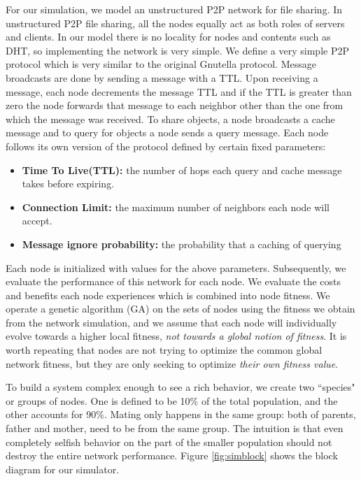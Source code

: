 \documentclass[12pt,journal,draftcls,letterpaper,onecolumn]{IEEEtran}
\begin{document}
For our simulation, we model an unstructured P2P network for file
sharing\cite{ek:survey}. In unstructured P2P file sharing, all the nodes
equally act as both roles of servers and clients.  In our model there is no
locality for nodes and contents such as DHT, so implementing the network is
very simple.  We define a very simple P2P protocol which is very similar to
the original Gnutella protocol.  Message broadcasts are done by sending a
message with a TTL.  Upon receiving a message, each node decrements the
message TTL and if the TTL is greater than zero the node forwards that message
to each neighbor other than the one from which the message was received.  To
share objects, a node broadcasts a cache message and to query for objects a
node sends a query message.  Each node follows its own version of the protocol
defined by certain fixed parameters:

\begin{itemize}
\item {\bf Time To Live(TTL):} the number of hops each query and cache message takes
before expiring.
\item {\bf Connection Limit:}
the maximum number of neighbors each node will accept.
\item {\bf Message ignore probability:}
the probability that a caching of querying 
\end{itemize}

Each node is initialized with values for the above parameters.  Subsequently,
we evaluate the performance of this network for each node.  We evaluate the
costs and benefits each node experiences which is combined into node fitness.
We operate a genetic algorithm (GA)\cite{genetic} on the sets of nodes using
the fitness we obtain from the network simulation, and we assume that each
node will individually evolve towards a higher local fitness, \emph{not
towards a global notion of fitness}.  It is worth repeating that nodes are not
trying to optimize the common global network fitness, but they are only
seeking to optimize \emph{their own fitness value}.

To build a system complex enough to see a rich behavior, we create two
``species" or groups of nodes.  One is defined to be 10\% of the total
population, and the other accounts for 90\%.
Mating only happens in the same group: both of parents, father and mother,
need to be from the same group.
The intuition is that even
completely selfish behavior on the part of the smaller population should not
destroy the entire network performance.
Figure \ref{fig:simblock} shows the block diagram for our simulator.
\end{document}
